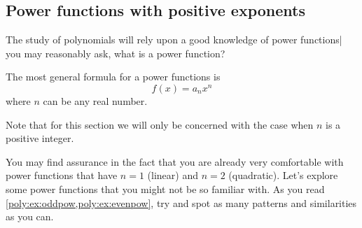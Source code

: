 \subsection*{Power functions with positive exponents}
The study of polynomials will rely upon a good knowledge 
of power functions| you may reasonably ask, what is a power function?
\begin{pccdefinition}
	The most general formula for a power functions is
	\[
		f(x) = a_n x^n
	\]
	where $n$ can be any real number.
	
	Note that for this section we will only be concerned with the 
	case when $n$ is a positive integer.
\end{pccdefinition}

You may find assurance in the fact that you are already very comfortable 
with power functions that have $n=1$ (linear) and $n=2$ (quadratic). Let's 
explore some power functions that you might not be so familiar with.
As you read \cref{poly:ex:oddpow,poly:ex:evenpow}, try and spot 
as many patterns and similarities as you can.

